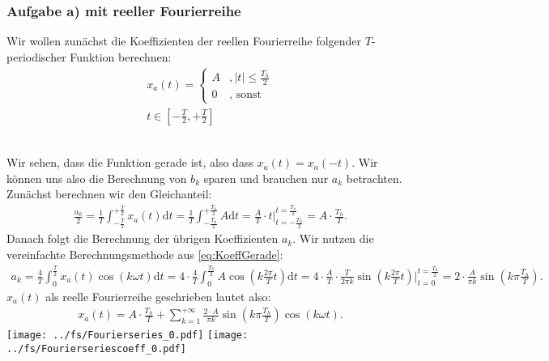 \documentclass[11pt,a4paper,DIV=12]{scrartcl}
\newcommand{\diff}{\mathrm{d}}
\begin{document}
\subsubsection*{Aufgabe a) mit reeller Fourierreihe}
\label{sec:TaskAReal}
Wir wollen zunächst die Koeffizienten der reellen Fourierreihe folgender $T$-periodischer Funktion berechnen:
\begin{gather}
	x_{a}(t)=
	\begin{cases}
		A &,|t| \leq \frac{T_h}{2} \\
		0 &,\text{ sonst}
	\end{cases}\\
	t\in[-\frac{T}{2},+\frac{T}{2}]\nonumber
\end{gather}
%
\begin{figure}[h!]
\centering
{}
\end{figure}
\\
Wir sehen, dass die Funktion gerade ist, also dass $x_{a}(t)=x_{a}(-t)$.
Wir können uns also die Berechnung von $b_k$ sparen und brauchen nur $a_k$ betrachten.\\
Zunächst berechnen wir den Gleichanteil:
\begin{align}
	\frac{a_0}{2}=\frac{1}{T}\int_{-\frac{T}{2}}^{+\frac{T}{2}}x_{a}(t)\diff t = \frac{1}{T}\int_{-\frac{T_h}{2}}^{+\frac{T_h}{2}}A\diff t=\frac{A}{T}\cdot t \Bigg |_{t=-\frac{T_h}{2}}^{t=\frac{T_h}{2}}=A\cdot\frac{T_h}{T}.
\end{align}
Danach folgt die Berechnung der übrigen Koeffizienten $a_k$. Wir nutzen die vereinfachte Berechnungsmethode aus \ref{eq:KoeffGerade}:
\begin{align}
	a_k=\frac{4}{T}\int_0^{\frac{T}{2}}x_{a}(t)\cos(k\omega t)\diff t=4\cdot\frac{4}{T}\int_0^{\frac{T_h}{2}}A\cos(k\frac{2\pi}{T} t)\diff t=4\cdot\frac{A}{T}\cdot\frac{T}{2\pi k}\sin(k\frac{2\pi}{T} t)\Bigg |_{t=0}^{t=\frac{T_h}{2}}=2\cdot\frac{A}{\pi k}\sin(k\pi \frac{T_h}{T}).
\end{align}
$x_{a}(t)$ als reelle Fourierreihe geschrieben lautet also:
\begin{align}
	x_{a}(t)=A\cdot\frac{T_h}{T}+\sum_{k=1}^{+\infty}\frac{2\cdot A}{\pi k}\sin(k\pi\frac{T_h}{T})\cos(k\omega t).
\end{align}
\newpage
\texttt{[image: ../fs/Fourierseries\_0.pdf]}
\texttt{[image: ../fs/Fourierseriescoeff\_0.pdf]}
\newpage
\end{document}

